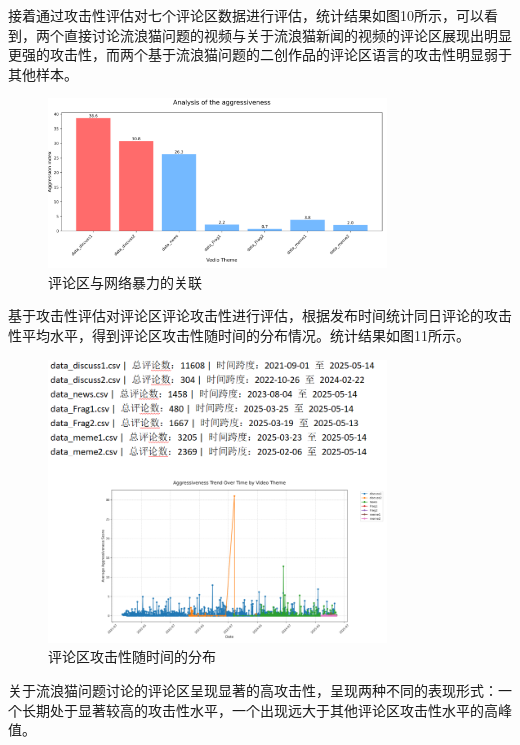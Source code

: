 \documentclass[12pt,a4paper]{ctexart}
\begin{document}
接着通过攻击性评估对七个评论区数据进行评估，统计结果如图10所示，可以看到，两个直接讨论流浪猫问题的视频与关于流浪猫新闻的视频的评论区展现出明显更强的攻击性，而两个基于流浪猫问题的二创作品的评论区语言的攻击性明显弱于其他样本。

\begin{figure}[htbp]
    \centering
    \includegraphics[width=0.8\textwidth]{img/comment_area_vs_violence.png}
    \caption{评论区与网络暴力的关联}
    \label{fig:comment_area_vs_violence}
\end{figure}

基于攻击性评估对评论区评论攻击性进行评估，根据发布时间统计同日评论的攻击性平均水平，得到评论区攻击性随时间的分布情况。统计结果如图11所示。

\begin{figure}[htbp]
    \centering
    \includegraphics[width=0.8\textwidth]{img/comment_area_vs_violence_time.png}
    \caption{评论区攻击性随时间的分布}
    \label{fig:comment_area_vs_violence_time}
\end{figure}

关于流浪猫问题讨论的评论区呈现显著的高攻击性，呈现两种不同的表现形式：一个长期处于显著较高的攻击性水平，一个出现远大于其他评论区攻击性水平的高峰值。
\end{document}
